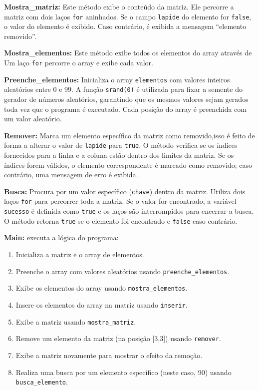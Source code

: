 \documentclass[12pt]{article}
\begin{document}
\textbf{Mostra\_matriz:} Este método exibe o conteúdo da matriz. Ele percorre a matriz com dois laços \texttt{for} aninhados. Se o campo \texttt{lapide} do elemento for \texttt{false}, o valor do elemento é exibido. Caso contrário, é exibida a mensagem ``elemento removido''.

\textbf{Mostra\_elementos:} Este método exibe todos os elementos do array através de Um laço \texttt{for} percorre o array e exibe cada valor.

\textbf{Preenche\_elementos:} Inicializa o array \texttt{elementos} com valores inteiros aleatórios entre 0 e 99. A função \texttt{srand(0)} é utilizada para fixar a semente do gerador de números aleatórios, garantindo que os mesmos valores sejam gerados toda vez que o programa é executado. Cada posição do array é preenchida com um valor aleatório.

\textbf{Remover:} Marca um elemento específico da matriz como removido,isso é feito de forma a alterar o  valor de \texttt{lapide} para \texttt{true}. O método verifica se os índices fornecidos para a linha e a coluna estão dentro dos limites da matriz. Se os índices forem válidos, o elemento correspondente é marcado como removido; caso contrário, uma mensagem de erro é exibida.

\textbf{Busca:} Procura por um valor específico (\texttt{chave}) dentro da matriz. Utiliza dois laços \texttt{for} para percorrer toda a matriz. Se o valor for encontrado, a variável \texttt{sucesso} é definida como \texttt{true} e os laços são interrompidos para encerrar a busca. O método retorna \texttt{true} se o elemento foi encontrado e \texttt{false} caso contrário.
\

\textbf{Main:} executa a lógica do programa:
\begin{enumerate}
    \item Inicializa a matriz e o array de elementos.
    \item Preenche o array com valores aleatórios usando \texttt{preenche\_elementos}.
    \item Exibe os elementos do array usando \texttt{mostra\_elementos}.
    \item Insere os elementos do array na matriz usando \texttt{inserir}.
    \item Exibe a matriz usando \texttt{mostra\_matriz}.
    \item Remove um elemento da matriz (na posição [3,3]) usando \texttt{remover}.
    \item Exibe a matriz novamente para mostrar o efeito da remoção.
    \item Realiza uma busca por um elemento específico (neste caso, 90) usando \texttt{busca\_elemento}.
\end{enumerate}
\end{document}
